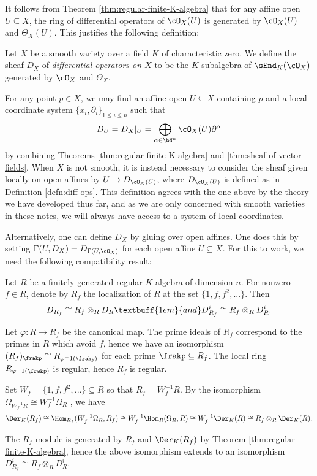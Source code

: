 It follows from Theorem \ref{thm:regular-finite-K-algebra} that for any affine open $U \subseteq X$, the ring of differential operators of $\cO_X(U)$ is generated by $\cO_X(U)$ and $\Theta_X(U)$. This justifies the following definition:
\begin{defn}\label{defn:sheaf-of-differential-operators}
	Let $X$ be a smooth variety over a field $K$ of characteristic zero. We define the sheaf $D_X$ of \emph{differential operators on $X$} to be the $K$-subalgebra of $\sEnd_{K}(\cO_X)$ generated by $\cO_X$ and $\Theta_X$. 
\end{defn}
For any point $p \in X$, we may find an affine open $U \subseteq X$ containing $p$ and a local coordinate system $\{x_i,\partial_i\}_{1\leq i\leq n}$ such that
\begin{align*}
	D_U = D_X|_U = \bigoplus_{\alpha \in \bN^n}\cO_X(U) \partial^{\alpha}
\end{align*}
by combining Theorems \ref{thm:regular-finite-K-algebra} and \ref{thm:sheaf-of-vector-fields}. When $X$ is not smooth, it is instead necessary to consider the sheaf given locally on open affines by $U \mapsto D_{\cO_X(U)}$, where $D_{\cO_X(U)}$ is defined as in Definition \ref{defn:diff-ops}. This definition agrees with the one above by the theory we have developed thus far, and as we are only concerned with smooth varieties in these notes, we will always have access to a system of local coordinates.

Alternatively, one can define $D_X$ by gluing over open affines. One does this by setting $\Gamma(U,D_X) = D_{\Gamma(U,\cO_X)}$ for each open affine $U \subseteq X$. For this to work, we need the following compatibility result:
\begin{prop}\label{prop:compatability-d-mod}
	Let $R$ be a finitely generated regular $K$-algebra of dimension $n$. For nonzero $f \in R$, denote by $R_f$ the localization of $R$ at the set $\{1,f,f^2,...\}$. Then
	\begin{align*}
		D_{R_f} \cong R_f \otimes_R D_{R} \textbuff{1em}{and} D^i_{R_f} \cong R_f \otimes_R D^i_{R}.
	\end{align*}
\end{prop}
\begin{prf}
	Let $\varphi:R\to R_f$ be the canonical map. The prime ideals of $R_f$ correspond to the primes in $R$ which avoid $f$, hence we have an isomorphism $(R_f)_\frakp\cong R_{\varphi^-1(\frakp)}$ for each prime $\frakp \subseteq R_f$. The local ring $R_{\varphi^-1(\frakp)}$ is regular, hence $R_f$ is regular.

	Set $W_f = \{1,f,f^2,...\}\subseteq R$ so that $R_f = W^{-1}_fR$. By the isomorphism $\Omega_{W_f^{-1}R} \cong W^{-1}_f\Omega_{R}$ \cite[Proposition 2.8.3]{hartshorne}, we have
	\begin{align*}
		\Der_K(R_f) \cong \Hom_{R_f}(W^{-1}_f\Omega_{R},R_f) \cong W^{-1}_f\Hom_{R}(\Omega_{R}, R) \cong W^{-1}_f\Der_K(R) \cong R_f\otimes_R\Der_K(R).
	\end{align*}
	
	The $R_f$-module is generated by $R_f$ and $\Der_K(R_f)$ by Theorem \ref{thm:regular-finite-K-algebra}, hence the above isomorphism extends to an isomorphism $D^i_{R_f}\cong R_f\otimes_R D^i_{R}$.
\end{prf}

